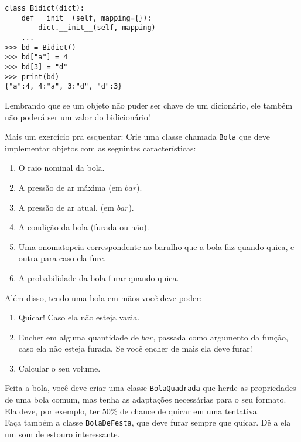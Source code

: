 \documentclass[12pt]{article}
\begin{document}
\begin{lstlisting}
class Bidict(dict):
    def __init__(self, mapping={}):
        dict.__init__(self, mapping)
    ...
>>> bd = Bidict()
>>> bd["a"] = 4
>>> bd[3] = "d"
>>> print(bd)
{"a":4, 4:"a", 3:"d", "d":3}
\end{lstlisting}

	Lembrando que se um objeto não puder ser chave de um dicionário, ele também não poderá ser um valor do bidicionário!
	
	
	Mais um exercício pra esquentar: Crie uma classe chamada \texttt{Bola} que deve implementar objetos com as seguintes características:
	
	\begin{enumerate}
		\item O raio nominal da bola.
		\item A pressão de ar máxima (em $bar$).
		\item A pressão de ar atual. (em $bar$).
		\item A condição da bola (furada ou não).
		\item Uma onomatopeia correspondente ao barulho que a bola faz quando quica, e outra para caso ela fure.
		\item A probabilidade da bola furar quando quica.
	\end{enumerate}
	
	Além disso, tendo uma bola em mãos você deve poder:
	
	\begin{enumerate}
		\item Quicar! Caso ela não esteja vazia.
		\item Encher em alguma quantidade de $bar$, passada como argumento da função, caso ela não esteja furada. Se você encher de mais ela deve furar!
		\item Calcular o seu volume.
	\end{enumerate}
	
	Feita a bola, você deve criar uma classe \texttt{BolaQuadrada} que herde as propriedades de uma bola comum, mas tenha as adaptações necessárias para o seu formato. Ela deve, por exemplo, ter $50\%$ de chance de quicar em uma tentativa.\\
	
	Faça também a classe \texttt{BolaDeFesta}, que deve furar sempre que quicar. Dê a ela um som de estouro interessante.
	
\end{document}
